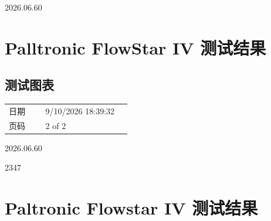 \documentclass[UTF8,10pt,a4paper,fontset=fandol]{ctexart}
\newcommand{\fieldvalue}[1]{#1}
\newcommand{\handwritten}[1]{#1}
\begin{document}
\handwritten{2026.06.60}

\bigskip

\section*{Palltronic FlowStar IV 测试结果}

\subsection*{测试图表}

\begin{tabular}{@{}p{0.27\linewidth}p{0.63\linewidth}@{}}
日期 &
\fieldvalue{9/10/2026 18:39:32}
\\
页码 &
\fieldvalue{2 of 2}
\end{tabular}

\begin{center}
\end{center}

\handwritten{2026.06.60}

\handwritten{2347}

\newpage

\section{Paltronic Flowstar IV 测试结果}
\end{document}

